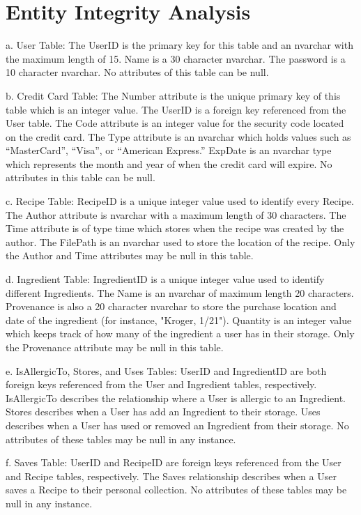 \documentclass{article}
\begin{document}
\section{Entity Integrity Analysis}
a.	User Table: The UserID is the primary key for this table and an nvarchar with the maximum length of 15. Name is a 30 character nvarchar. The password is a 10 character nvarchar. No attributes of this table can be null.
 
b.	Credit Card Table: The Number attribute is the unique primary key of this table which is an integer value. The UserID is a foreign key referenced from the User table. The Code attribute is an integer value for the security code located on the credit card. The Type attribute is an nvarchar which holds values such as “MasterCard”, “Visa”, or “American Express.” ExpDate is an nvarchar type which represents the month and year of when the credit card will expire. No attributes in this table can be null.

c.	Recipe Table: RecipeID is a unique integer value used to identify every Recipe. The Author attribute is nvarchar with a maximum length of 30 characters. The Time attribute is of type time which stores when the recipe was created by the author. The FilePath is an nvarchar used to store the location of the recipe. Only the Author and Time attributes may be null in this table.

d.	Ingredient Table: IngredientID is a unique integer value used to identify different Ingredients. The Name is an nvarchar of maximum length 20 characters. Provenance is also a 20 character nvarchar to store the purchase location and date of the ingredient (for instance, "Kroger, 1/21"). Quantity is an integer value which keeps track of how many of the ingredient a user has in their storage. Only the Provenance attribute may be null in this table.

e.	IsAllergicTo, Stores, and Uses Tables: UserID and IngredientID are both foreign keys referenced from the User and Ingredient tables, respectively. IsAllergicTo describes the relationship where a User is allergic to an Ingredient. Stores describes when a User has add an Ingredient to their storage. Uses describes when a User has used or removed an Ingredient from their storage. No attributes of these tables may be null in any instance.

f.	Saves Table: UserID and RecipeID are foreign keys referenced from the User and Recipe tables, respectively. The Saves relationship describes when a User saves a Recipe to their personal collection. No attributes of these tables may be null in any instance.
 
\end{document}
